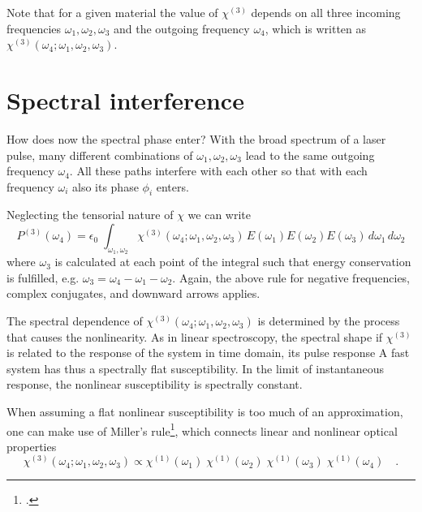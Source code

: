 Note that for a given material the value of $\chi^{(3)} $ depends on all three incoming frequencies $\omega_1, \omega_2, \omega_3$ and the outgoing frequency $\omega_4$, which is written as  $\chi^{(3)}(\omega_4; \omega_1, \omega_2, \omega_3)$. 

\section{Spectral interference}

How does now the spectral phase enter? With the broad spectrum of  a laser pulse, many different combinations of $\omega_1, \omega_2, \omega_3$ lead to the same outgoing frequency $\omega_4$. All these paths interfere with each other so that with each frequency $\omega_i$ also its phase $\phi_i$ enters.

Neglecting the tensorial nature of $\chi$ we can write
\begin{equation}
  P^{(3)}(\omega_4) = \epsilon_0 \; 
    \int_{\omega_1, \omega_2} \chi^{(3)}(\omega_4; \omega_1, \omega_2, \omega_3) \,  E(\omega_1) E(\omega_2) E(\omega_3) \, d\omega_1 \, d\omega_2  
\end{equation}	
where $\omega_3$ is calculated at each point of the integral such that energy conservation is fulfilled, e.g. $\omega_3 = \omega_4 - \omega_1 - \omega_2$. Again, the above rule for negative frequencies, complex conjugates, and downward arrows applies.

The spectral dependence of $\chi^{(3)}(\omega_4; \omega_1, \omega_2, \omega_3)$ is determined by the process that causes the nonlinearity. As in linear spectroscopy, the spectral shape if  $\chi^{(3)}$ is related to the response of the system in time domain, its pulse response A fast system has thus a spectrally flat susceptibility. In the limit of instantaneous response, the nonlinear susceptibility is spectrally constant.
		
When assuming a flat nonlinear susceptibility is too much of an approximation, one can make use of Miller's rule\footcite{Boyd2008,Miller64,Obermeier18}, which connects linear and nonlinear optical properties
\begin{equation}
  \chi^{(3)}(\omega_4; \omega_1, \omega_2, \omega_3) \propto  \chi^{(1)}(\omega_1) \;   \chi^{(1)}(\omega_2)  \;   \chi^{(1)}(\omega_3)  \;   \chi^{(1)}(\omega_4)  \quad .
 \end{equation}
 		

 
\printbibliography[segment=\therefsegment,heading=subbibliography]


